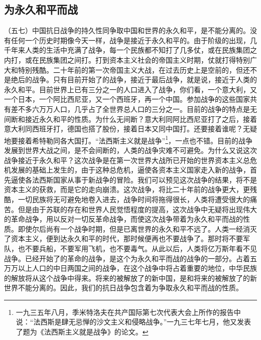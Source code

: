 \documentclass[cn,11pt,chinese]{elegantbook}
\def\myformat#1{\hfil\hfil #1}
\begin{document}
\subsection*{\myformat{为永久和平而战}}
（五七）中国抗日战争的持久性同争取中国和世界的永久和平，是不能分离的。没有任何一个历史时期像今天一样，战争是接近于永久和平的。由于阶级的出现，几千年来人类的生活中充满了战争，每一个民族都不知打了几多仗，或在民族集团之内打，或在民族集团之间打。打到资本主义社会的帝国主义时期，仗就打得特别广大和特别残酷。二十年前的第一次帝国主义大战，在过去历史上是空前的，但还不是绝后的战争。只有目前开始了的战争，接近于最后战争，就是说，接近于人类的永久和平。目前世界上已有三分之一的人口进入了战争，你们看，一个意大利，又一个日本，一个阿比西尼亚，又一个西班牙，再一个中国。参加战争的这些国家共有差不多六万万人口，几乎占了全世界总人口的三分之一。目前的战争的特点是无间断和接近永久和平的性质。为什么无间断？意大利同阿比西尼亚打了之后，接着意大利同西班牙打，德国也搭了股份，接着日本又同中国打。还要接着谁呢？无疑地要接着希特勒同各大国打。“法西斯主义就是战争”\footnote[20]{ 一九三五年八月，季米特洛夫在共产国际第七次代表大会上所作的报告中说：“法西斯是肆无忌惮的沙文主义和侵略战争。”一九三七年七月，他又发表了题为《法西斯主义就是战争》的论文。}，一点也不错。目前的战争发展到世界大战之间，是不会间断的，人类的战争灾难不可避免。为什么又说这次战争接近于永久和平？这次战争是在第一次世界大战所已开始的世界资本主义总危机发展的基础上发生的，由于这种总危机，逼使各资本主义国家走入新的战争，首先逼使各法西斯国家从事于新战争的冒险。我们可以预见这次战争的结果，将不是资本主义的获救，而是它的走向崩溃。这次战争，将比二十年前的战争更大，更残酷，一切民族将无可避免地卷入进去，战争时间将拖得很长，人类将遭受很大的痛苦。但是由于苏联的存在和世界人民觉悟程度的提高，这次战争中无疑将出现伟大的革命战争，用以反对一切反革命战争，而使这次战争带着为永久和平而战的性质。即使尔后尚有一个战争时期，但是已离世界的永久和平不远了。人类一经消灭了资本主义，便到达永久和平的时代，那时候便再也不要战争了。那时将不要军队，也不要兵船，不要军用飞机，也不要毒气。从此以后，人类将亿万斯年看不见战争。已经开始了的革命的战争，是这个为永久和平而战的战争的一部分。占着五万万以上人口的中日两国之间的战争，在这个战争中将占着重要的地位，中华民族的解放将从这个战争中得来。将来的被解放了的新中国，是和将来的被解放了的新世界不能分离的。因此，我们的抗日战争包含着为争取永久和平而战的性质。\\
\end{document}
